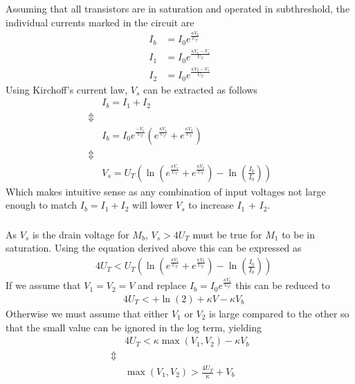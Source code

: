 \subsubsection{}
Assuming that all transistors are in saturation and operated in subthreshold, the individual
currents marked in the circuit are
\begin{align*}
    I_b &= I_0e^{\frac{\kappa V_b}{U_T}} \\
    I_1 &= I_0e^{\frac{\kappa V_1-V_s}{U_T}} \\
    I_2 &= I_0e^{\frac{\kappa V_2-V_s}{U_T}}
\end{align*}
Using Kirchoff's current law, \(V_s\) can be extracted as follows
\begin{align*}
    &I_b = I_1+I_2  \\
    \Updownarrow \\
    &I_b = I_0e^{\frac{-V_s}{U_T}}\left(e^{\frac{\kappa V_1}{U_T}}+e^{\frac{\kappa V_2}{U_T}}\right) \\
    \Updownarrow \\
    &V_s = U_T\left(\ln\left(e^{\frac{\kappa V_1}{U_T}}+e^{\frac{\kappa V_2}{U_T}}\right) - \ln\left(\frac{I_b}{I_0}\right)\right)
\end{align*}
Which makes intuitive sense as any combination of input voltages not large enough to match \(I_b = I_1+I_2\) will lower 
\(V_s\) to increase \(I_1\) + \(I_2\).

\subsubsection{}
As \(V_s\) is the drain voltage for \(M_b\), \(V_s > 4U_T\) must be true for \(M_1\) to be in saturation.
Using the equation derived above this can be expressed as
\begin{align*}
    &4U_T < U_T\left(\ln\left(e^{\frac{\kappa V_1}{U_T}}+e^{\frac{\kappa V_2}{U_T}}\right) - \ln\left(\frac{I_b}{I_0}\right)\right)
\end{align*}
If we assume that \(V_1=V_2=V\) and replace \(I_b = I_0e^{\frac{\kappa V_b}{U_T}}\) this can be reduced to 
\begin{align*}
    &4U_T < +\ln(2) + \kappa V - \kappa V_b
\end{align*}
Otherwise we must assume that either \(V_1\) or \(V_2\) is large compared to the other so that the small value can be ignored in
the log term, yielding
\begin{align*}
    &4U_T < \kappa \max(V_1, V_2) - \kappa V_b \\
    \Updownarrow \\
    &\max(V_1, V_2) > \frac{4U_T}{\kappa}+ V_b
\end{align*}
